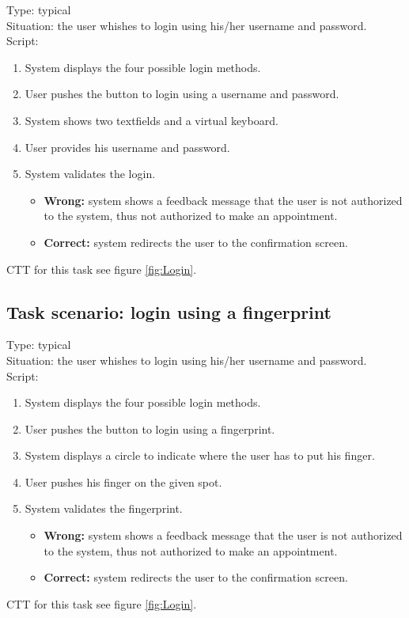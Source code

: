 \documentclass[11pt, a4paper,svglistings]{report}
\begin{document}
Type: typical \\
Situation: the user whishes to login using his/her username and password. \\
Script:
\begin{enumerate}
\item System displays the four possible login methods.
\item User pushes the button to login using a username and password.
\item System shows two textfields and a virtual keyboard.
\item User provides his username and password.
\item System validates the login.
\begin{itemize}
\item \textbf{Wrong:} system shows a feedback message that the user is not authorized to the system, thus not authorized to make an appointment.
\item \textbf{Correct:} system redirects the user to the  confirmation screen.
\end{itemize}
\end{enumerate}
CTT for this task see figure \ref{fig:Login}.

\subsection{\label{subsec:loginFinger}Task scenario: login using a fingerprint}

Type: typical \\
Situation: the user whishes to login using his/her username and password. \\
Script:
\begin{enumerate}
\item System displays the four possible login methods.
\item User pushes the button to login using a fingerprint.
\item System displays a circle to indicate where the user has to put his finger.
\item User pushes his finger on the given spot.
\item System validates the fingerprint.
\begin{itemize}
\item \textbf{Wrong:} system shows a feedback message that the user is not authorized to the system, thus not authorized to make an appointment.
\item \textbf{Correct:} system redirects the user to the  confirmation screen.
\end{itemize}
\end{enumerate}
CTT for this task see figure \ref{fig:Login}.
\end{document}
